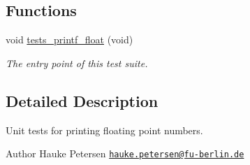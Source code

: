 \subsection*{Functions}
\begin{DoxyCompactItemize}
\item 
void \hyperlink{group__unittests_ga931f7ea19ee04d7b42dd1adb0f8ad87a}{tests\+\_\+printf\+\_\+float} (void)
\begin{DoxyCompactList}\small\item\em The entry point of this test suite. \end{DoxyCompactList}\end{DoxyCompactItemize}


\subsection{Detailed Description}
Unit tests for printing floating point numbers. 

\begin{DoxyAuthor}{Author}
Hauke Petersen \href{mailto:hauke.petersen@fu-berlin.de}{\tt hauke.\+petersen@fu-\/berlin.\+de} 
\end{DoxyAuthor}
